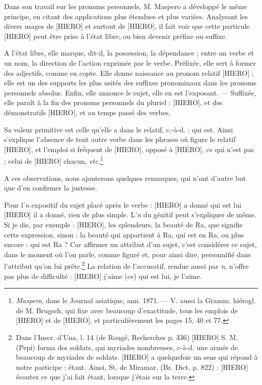 \documentclass[a4paper, 11pt, oneside]{article}
\begin{document}
Dans son travail sur les pronoms personnels, M. Maspero a développé le même principe, en citant des applications plus étendues et plus variées. Analysant les divers usages de [HIERO] et surtout de [HIERO], il fait voir que cette particule [HIERO] peut être prise à l'état libre, ou bien devenir préfixe ou suffixe.

A l'état libre, elle marque, dit-il, la possession, la dépendance ; entre un verbe et un nom, la direction de l'action exprimée par le verbe. Préfixée, elle sert à former des adjectifs, comme en copte. Elle donne naissance au pronom relatif [HIERO] ; elle est un des supports les plus usités des suffixes pronominaux dans les pronoms personnels absolus. Enfin, elle annonce le sujet, elle en est l'exposant. --- Suffixée, elle paraît à la fin des pronoms personnels du pluriel : [HIERO], et des démonstratifs [HIERO], et au temps passé des verbes.

Sa valeur primitive est celle qu'elle a dans le relatif, c.-à-d. : qui est. Ainsi s'explique l'absence de tout autre verbe dans les phrases où figure le relatif [HIERO], et l'emploi si fréquent de [HIERO], opposé à [HIERO], ce qui n'est pas ; celui de [HIERO] chacun, \emph{etc.}\footnote{\emph{Maspero}, dans le Journal asiatique, ann. 1871. --- V. aussi la Gramm. hiérogl. de M. Brugsch, qui fixe avec beaucoup d'exactitude, tous les emplois de [HIERO] et de [HIERO], et particulièrement les pages 15, 40 et 77.}

A ces observations, nous ajouterons quelques remarques, qui n'ont d'autre but que d'en confirmer la justesse.

Pour l'\emph{n} expositif du sujet placé après le verbe : [HIERO] a donné qui est lui [HIERO] il a donné, rien de plus simple. L'\emph{n} du génitif peut s'expliquer de même. Si je dis, par exemple : [HIERO], les splendeurs, la beauté de Ra, que signifie cette expression, sinon : la beauté qui appartient à Ra, qui est en Ra, ou plus encore : qui est Ra ? Car affirmer un attribut d'un sujet, c'est considérer ce sujet, dans le moment où l'on parle, comme figuré et, pour ainsi dire, personnifié dans l'attribut qu'on lui prête.\footnote{Dans l'Inscr. d'Una, l. 14 (de Rougé, Recherches p. 336) [HIERO] S. M. (Pepi) forma des soldats, qui myriades nombreuses, c-à-d. une armée de beaucoup de myriades de soldats.  [HIERO] a quelquefois un sens qui répond à notre participe : étant. Ainsi, St. de Miramar, (Br. Dict. p. 822) : [HIERO] écoutez ce que j'ai fait étant, lorsque j'étais sur la terre.} La relation de l'accusatif, rendue aussi par \emph{n}, n'offre pas plus de difficulté : [HIERO] j'aime (ce) qui est lui, je l'aime.
\end{document}
